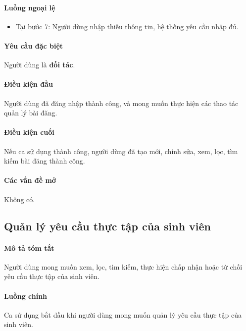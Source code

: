 \documentclass[./../main.tex]{subfiles}
\begin{document}
\paragraph*{Luồng ngoại lệ}

\begin{itemize}
	\item

	      Tại bước 7: Người dùng nhập thiếu thông tin, hệ thống yêu cầu nhập đủ.

\end{itemize}

\paragraph*{Yêu cầu đặc biệt}

Người dùng là \textbf{đối tác}.

\paragraph*{Điều kiện đầu}

Người dùng đã đăng nhập thành công, và mong muốn thực hiện các thao tác quản lý bài đăng.

\paragraph*{Điều kiện cuối}

Nếu ca sử dụng thành công, người dùng đã tạo mới, chỉnh sửa, xem, lọc, tìm kiếm bài đăng thành công.

\paragraph*{Các vấn đề mở}

Không có.

\subsection{Quản lý yêu cầu thực tập của sinh viên}

\paragraph*{Mô tả tóm tắt}

Người dùng mong muốn xem, lọc, tìm kiếm, thực hiện chấp nhận hoặc từ chối yêu cầu thực tập của sinh viên.

\paragraph*{Luồng chính} Ca sử dụng bắt đầu khi người dùng mong muốn quản lý yêu cầu thực tập của sinh viên.
\end{document}
